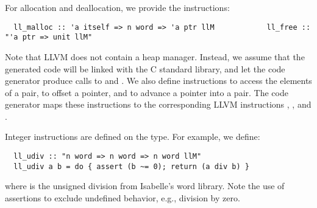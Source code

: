 \documentclass[a4paper,USenglish,cleveref, autoref]{lipics-v2019}
\begin{document}
For allocation and deallocation, we provide the instructions:
\begin{lstlisting}
  ll_malloc :: 'a itself => n word => 'a ptr llM            ll_free :: "'a ptr => unit llM"
\end{lstlisting}
Note that LLVM does not contain a heap manager. 
Instead, we assume that the generated code will be linked with the C standard library, 
and let the code generator produce calls to  and .
%
We also define instructions to access the elements of a pair, to offset a pointer, and to advance a pointer into a pair.
The code generator maps these instructions to the corresponding LLVM instructions , , and .

Integer instructions are defined on the  type. For example, we define:
\begin{lstlisting}
  ll_udiv :: "n word => n word => n word llM"
  ll_udiv a b = do { assert (b ~= 0); return (a div b) }
\end{lstlisting}
where  is the unsigned division from Isabelle's word library.
Note the use of assertions to exclude undefined behavior, e.g., division by zero.
\end{document}
